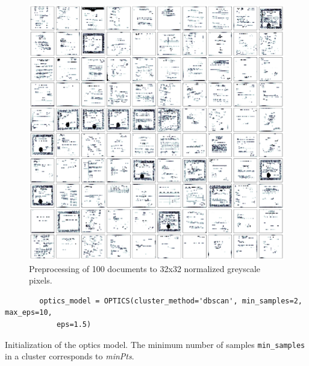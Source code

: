 \begin{figure}[!htp] %
    \centering
    \includegraphics[width=1\textwidth]{images/OPTICS/32x32/preprocessed_docs.pdf}
    \caption[Preprocessing to 32x32 normalized greyscale pixels]{Preprocessing of 100 documents to 32x32 normalized greyscale pixels.
    }
    \label{fig:preprocessed_docs_32x32}
\end{figure}



\begin{listing}[!htp]
    \begin{verbatim}
        optics_model = OPTICS(cluster_method='dbscan', min_samples=2, max_eps=10, 
            eps=1.5)
    \end{verbatim}
    \caption[Initialization of the \ac{optics} model]{Initialization of the \ac{optics} model.
    The minimum number of samples \texttt{min\_samples} in a cluster corresponds to \textit{minPts}.
    }
    \label{lst:optics_model}
\end{listing}


